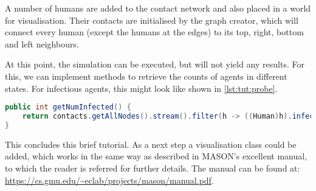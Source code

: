 \documentclass[a4paper, 12pt, bibliography=numbered]{article}
\begin{document}
A number of humans are added to the contact network and also placed in a world for visualisation. Their contacts are initialised by the graph creator, which will connect every human (except the humans at the edges) to its top, right, bottom and left neighbours.

At this point, the simulation can be executed, but will not yield any results. For this, we can implement methods to retrieve the counts of agents in different states. For infectious agents, this might look like shown in \autoref{lst:tut:probe}.

\begin{lstlisting}[label=lst:tut:probe,caption={A method probing the number of infectious agents.},language=Java]
public int getNumInfected() {
    return contacts.getAllNodes().stream().filter(h -> ((Human)h).infectionState == InfectionState.INFECTIOUS).count();
}
\end{lstlisting}

This concludes this brief tutorial. As a next step a visualisation class could be added, which works in the same way as described in MASON's excellent manual, to which the reader is referred for further details. The manual can be found at: \url{https://cs.gmu.edu/~eclab/projects/mason/manual.pdf}.
\end{document}
